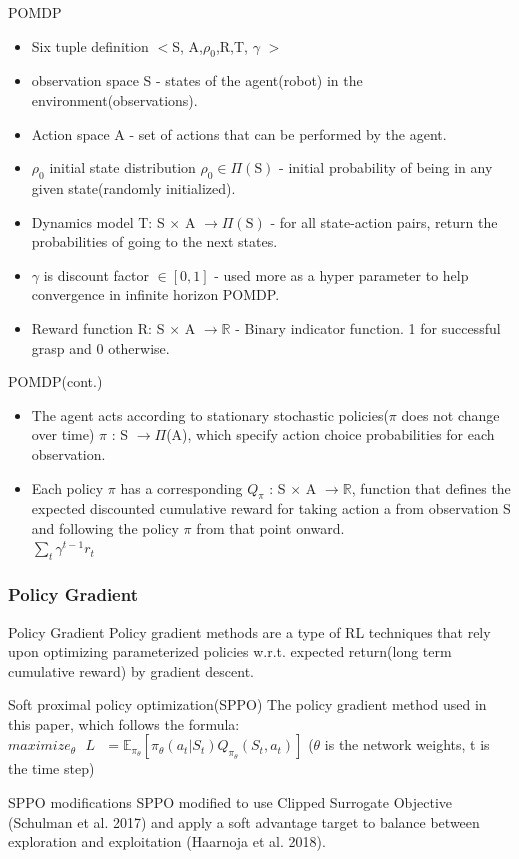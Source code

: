 \documentclass{beamer}
\begin{document}
\begin{frame}{POMDP}
\begin{itemize}
\item Six tuple definition $<$S, A,$\rho_0$,R,T, $\gamma$ $>$
\item observation space S - states of the agent(robot) in the environment(observations).
\item Action space A - set of actions that can be performed by the agent.
\item $\rho_0$ initial state distribution $\rho_0 \in \Pi(\text{S})$ - initial probability of being in any given state(randomly initialized).
\item Dynamics model T: S $\times$ A $\rightarrow \Pi(\text{S})$ - for all state-action pairs, return the probabilities of going to the next states.
\item $\gamma$ is discount factor $\in [0,1]$ - used more as a hyper parameter to help convergence in infinite horizon POMDP.
\item Reward function R: S $\times$ A $\rightarrow \mathbb{R}$ - Binary indicator function. 1 for successful grasp and 0 otherwise.
\end{itemize}
\end{frame}

\begin{frame}{POMDP(cont.)}
\begin{itemize}
\item The agent acts according to stationary stochastic policies($\pi$ does not change over time) $\pi$ : S $\rightarrow \Pi$(A), which specify action choice probabilities for each observation.
\item Each policy $\pi$ has a corresponding $Q_\pi$ : S $\times$ A $\rightarrow\mathbb{R}$, function that defines the expected discounted cumulative reward for taking action a from observation S and following the policy $\pi$ from that point
onward.\\ $\sum_t \gamma^{t-1} r_t$
\end{itemize}
\end{frame}

\begin{frame}\frametitle{Policy Gradient} 
\begin{block}{Policy Gradient}
Policy gradient methods are a type of RL techniques that rely upon optimizing parameterized policies w.r.t. expected return(long term cumulative reward) by gradient descent.
\end{block}
\begin{block}{Soft proximal policy optimization(SPPO)}
The policy gradient method used in this paper, which follows the formula: $maximize_\theta \text{ }L\text{ }  = \mathbb{E}_{\pi_\theta} [\pi_{\theta} (a_t | S_t)Q_{\pi_\theta} (S_t, a_t)]$ ($\theta$ is the network weights, t is the time step)
\end{block}
\begin{block}{SPPO modifications}
SPPO modified to use Clipped Surrogate Objective (Schulman et al. 2017) and apply a soft advantage target to balance between exploration and exploitation (Haarnoja et al. 2018).
\end{block}

\end{frame}
\end{document}
